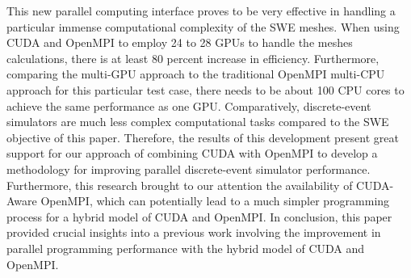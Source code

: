 \documentclass[11pt]{article}
\begin{document}
This new parallel computing interface proves to be very effective in handling a particular immense computational complexity of the SWE meshes. When using CUDA and OpenMPI to employ 24 to 28 GPUs to handle the meshes calculations, there is at least 80 percent increase in efficiency. Furthermore, comparing the multi-GPU approach to the traditional OpenMPI multi-CPU approach for this particular test case, there needs to be about 100 CPU cores to achieve the same performance as one GPU. Comparatively, discrete-event simulators are much less complex computational tasks compared to the SWE objective of this paper. Therefore, the results of this development present great support for our approach of combining CUDA with OpenMPI to develop a methodology for improving parallel discrete-event simulator performance.  Furthermore, this research brought to our attention the availability of CUDA-Aware OpenMPI, which can potentially lead to a much simpler programming process for a hybrid model of CUDA and OpenMPI. In conclusion, this paper provided crucial insights into a previous work involving the improvement in parallel programming performance with the hybrid model of CUDA and OpenMPI.
\end{document}
